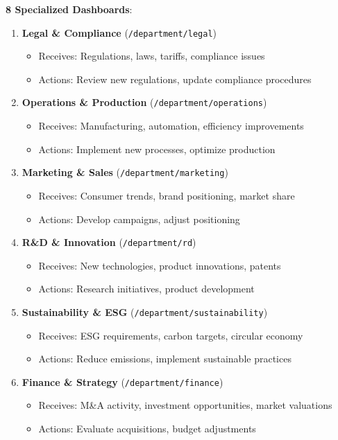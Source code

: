 \documentclass[11pt,a4paper]{article}
\begin{document}
\textbf{8 Specialized Dashboards}:
\begin{enumerate}[leftmargin=*]
    \item \textbf{Legal \& Compliance} (\texttt{/department/legal})
    \begin{itemize}
        \item Receives: Regulations, laws, tariffs, compliance issues
        \item Actions: Review new regulations, update compliance procedures
    \end{itemize}
    
    \item \textbf{Operations \& Production} (\texttt{/department/operations})
    \begin{itemize}
        \item Receives: Manufacturing, automation, efficiency improvements
        \item Actions: Implement new processes, optimize production
    \end{itemize}
    
    \item \textbf{Marketing \& Sales} (\texttt{/department/marketing})
    \begin{itemize}
        \item Receives: Consumer trends, brand positioning, market share
        \item Actions: Develop campaigns, adjust positioning
    \end{itemize}
    
    \item \textbf{R\&D \& Innovation} (\texttt{/department/rd})
    \begin{itemize}
        \item Receives: New technologies, product innovations, patents
        \item Actions: Research initiatives, product development
    \end{itemize}
    
    \item \textbf{Sustainability \& ESG} (\texttt{/department/sustainability})
    \begin{itemize}
        \item Receives: ESG requirements, carbon targets, circular economy
        \item Actions: Reduce emissions, implement sustainable practices
    \end{itemize}
    
    \item \textbf{Finance \& Strategy} (\texttt{/department/finance})
    \begin{itemize}
        \item Receives: M\&A activity, investment opportunities, market valuations
        \item Actions: Evaluate acquisitions, budget adjustments
    \end{itemize}
    

\end{enumerate}
\end{document}
